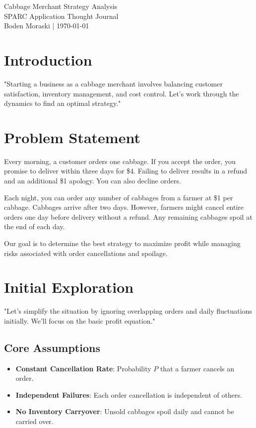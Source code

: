 \documentclass[11pt]{article}
\begin{document}
\begin{center}
\sffamily
{\Huge Cabbage Merchant Strategy Analysis}\\[0.5em]
{\large SPARC Application Thought Journal}\\[1em]
Boden Moraski | \today
\end{center}

\section*{Introduction}
\begin{thoughtbox}
"Starting a business as a cabbage merchant involves balancing customer satisfaction, inventory management, and cost control. Let's work through the dynamics to find an optimal strategy."
\end{thoughtbox}

\section*{Problem Statement}
Every morning, a customer orders one cabbage. If you accept the order, you promise to deliver within three days for \$4. Failing to deliver results in a refund and an additional \$1 apology. You can also decline orders.

Each night, you can order any number of cabbages from a farmer at \$1 per cabbage. Cabbages arrive after two days. However, farmers might cancel entire orders one day before delivery without a refund. Any remaining cabbages spoil at the end of each day.

Our goal is to determine the best strategy to maximize profit while managing risks associated with order cancellations and spoilage.

\section*{Initial Exploration}
\begin{thoughtbox}
"Let's simplify the situation by ignoring overlapping orders and daily fluctuations initially. We'll focus on the basic profit equation."
\end{thoughtbox}

\subsection*{Core Assumptions}
\begin{itemize}[leftmargin=*,label=\color{DarkSlateBlue}\textbullet]
  \item \textbf{Constant Cancellation Rate}: Probability \( P \) that a farmer cancels an order.
  \item \textbf{Independent Failures}: Each order cancellation is independent of others.
  \item \textbf{No Inventory Carryover}: Unsold cabbages spoil daily and cannot be carried over.
\end{itemize}
\end{document}
